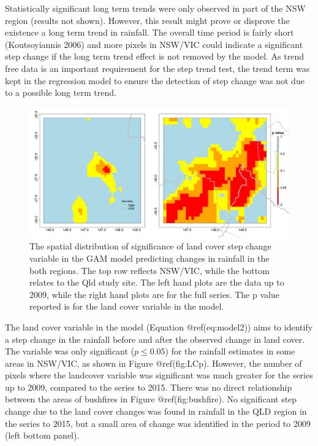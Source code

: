 \documentclass[fleqn,10pt,lineno]{wlpeerj} %
\begin{document}
Statistically significant long term trends were only observed in part of
the NSW region (results not shown). However, this result might prove or
disprove the existence a long term trend in rainfall. The overall time
period is fairly short (Koutsoyiannis 2006) and more pixels in NSW/VIC
could indicate a significant step change if the long term trend effect
is not removed by the model. As trend free data is an important
requirement for the step trend test, the trend term was kept in the
regression model to ensure the detection of step change was not due to a
possible long term trend.

\begin{figure}
\includegraphics[width=0.9\linewidth]{figures/Cp_30yrs} \caption{The spatial distribution of significance of land cover step change variable in the GAM model predicting changes in rainfall in the both regions. The top row reflects NSW/VIC, while the bottom relates to the Qld study site. The left hand plots are the data up to 2009, while the right hand plots are for the full series. The p value reported is for the land cover variable in the model.}\label{fig:LCp}
\end{figure}

The land cover variable in the model (Equation @ref(eq:model2)) aims to
identify a step change in the rainfall before and after the observed
change in land cover. The variable was only significant
(\(p \leq 0.05\)) for the rainfall estimates in some areas in NSW/VIC,
as shown in Figure @ref(fig:LCp). However, the number of pixels where
the landcover variable was significant was much greater for the series
up to 2009, compared to the series to 2015. There was no direct
relationship between the areas of bushfires in Figure
@ref(fig:bushfire). No significant step change due to the land cover
changes was found in rainfall in the QLD region in the series to 2015,
but a small area of change was identified in the period to 2009 (left
bottom panel).
\end{document}
